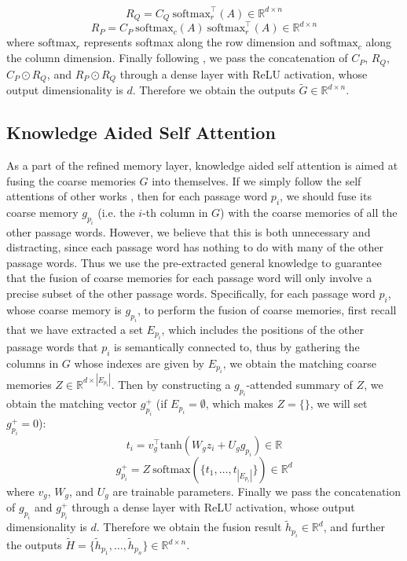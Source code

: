 \documentclass[11pt,a4paper]{article}
\begin{document}
\[R_Q = C_Q \ \mathrm{softmax}_r^\top(A) \in \mathbb{R}^{d \times n}\]
\[R_P = C_P \ \mathrm{softmax}_c(A) \ \mathrm{softmax}_r^\top(A) \in \mathbb{R}^{d \times n}\]
where $\mathrm{softmax}_r$ represents softmax along the row dimension and $\mathrm{softmax}_c$ along the column dimension. Finally following \citet{clarkchristopher:2017}, we pass the concatenation of $C_P$, $R_Q$, $C_P \odot R_Q$, and $R_P \odot R_Q$ through a dense layer with ReLU activation, whose output dimensionality is $d$. Therefore we obtain the outputs $\tilde{G} \in \mathbb{R}^{d \times n}$.

\subsection{Knowledge Aided Self Attention}
As a part of the refined memory layer, knowledge aided self attention is aimed at fusing the coarse memories $G$ into themselves. If we simply follow the self attentions of other works \cite{wangwenhui:2017,huanghsinyuan:2017,liuxiaodong:2017,clarkchristopher:2017}, then for each passage word $p_i$, we should fuse its coarse memory $g_{p_i}$ (i.e. the $i$-th column in $G$) with the coarse memories of all the other passage words. However, we believe that this is both unnecessary and distracting, since each passage word has nothing to do with many of the other passage words. Thus we use the pre-extracted general knowledge to guarantee that the fusion of coarse memories for each passage word will only involve a precise subset of the other passage words. Specifically, for each passage word $p_i$, whose coarse memory is $g_{p_i}$, to perform the fusion of coarse memories, first recall that we have extracted a set $E_{p_i}$, which includes the positions of the other passage words that $p_i$ is semantically connected to, thus by gathering the columns in $G$ whose indexes are given by $E_{p_i}$, we obtain the matching coarse memories $Z \in \mathbb{R}^{d \times |E_{p_i}|}$. Then by constructing a $g_{p_i}$-attended summary of $Z$, we obtain the matching vector $g^+_{p_i}$ (if $E_{p_i} = \emptyset$, which makes $Z = \{\}$, we will set $g^+_{p_i} = 0$):
\[t_i = v_g^\top \mathrm{tanh}(W_g z_i + U_g g_{p_i}) \in \mathbb{R}\]
\[g^+_{p_i} = Z \ \mathrm{softmax}(\{t_1, \ldots, t_{|E_{p_i}|}\}) \in \mathbb{R}^{d}\]
where $v_g$, $W_g$, and $U_g$ are trainable parameters. Finally we pass the concatenation of $g_{p_i}$ and $g^+_{p_i}$ through a dense layer with ReLU activation, whose output dimensionality is $d$. Therefore we obtain the fusion result $\tilde{h}_{p_i} \in \mathbb{R}^{d}$, and further the outputs $\tilde{H} = \{\tilde{h}_{p_1}, \ldots, \tilde{h}_{p_n}\} \in \mathbb{R}^{d \times n}$.
\end{document}
